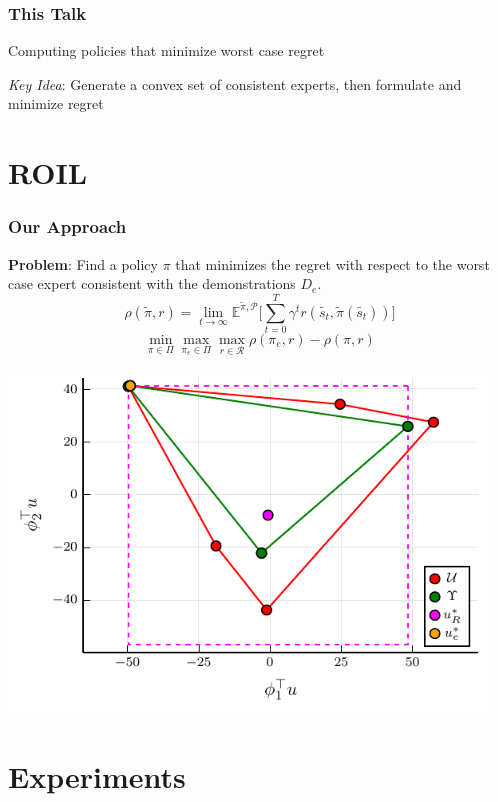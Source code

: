 \documentclass{beamer}
\begin{document}
\begin{frame}
	\frametitle{This Talk}
	Computing policies that minimize worst case regret

	\vfill
	\emph{Key Idea}: Generate a convex set of consistent experts, then formulate and minimize regret
\end{frame}

\section*{ROIL}

\begin{frame}
	\frametitle{Our Approach}
	\textbf{Problem}: Find a policy $\pi$ that minimizes the regret with respect to the worst case expert consistent with the demonstrations $D_e$.
	\[ \rho(\tilde{\pi}, r) = \lim_{t \to \infty} \mathbb{E}^{\tilde{\pi}, \mathcal{P}} \lbrack \sum_{t=0}^T \gamma^t r(\tilde{s_t}, \tilde{\pi}(\tilde{s_t})) \rbrack \]
	\[ \min_{\pi \in \Pi} \max_{\pi_e \in \Pi} \max_{r \in \mathcal{R}} \rho(\pi_e, r) - \rho(\pi, r)\]
\end{frame}

\begin{frame}
  \vfill
  \begin{center}
	  \includegraphics[width=0.95\textwidth, height=0.85\textheight]{../../pres_roil/plots/visual_solve_cheb.pdf}
  \end{center}
\end{frame}

\section*{Experiments}
\end{document}
